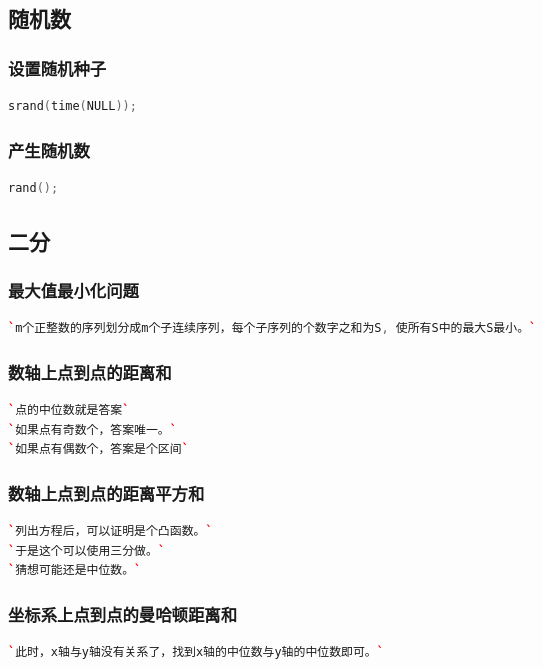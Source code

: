 \documentclass[a4paper]{article}
\begin{document}
\begin{CJK*}{UTF8}{gbsn}
\begin{multicols}{3}
\begin{flushleft}
\subsection{随机数}

\subsubsection{设置随机种子}
\begin{lstlisting}[language={c++}]
srand(time(NULL));
\end{lstlisting}

\subsubsection{产生随机数}
\begin{lstlisting}[language={c++}]
rand();
\end{lstlisting}




\subsection{二分}

\subsubsection{最大值最小化问题}
\begin{lstlisting}[language={c++}]
`m个正整数的序列划分成m个子连续序列，每个子序列的个数字之和为S, 使所有S中的最大S最小。`
\end{lstlisting}


\subsubsection{数轴上点到点的距离和}
\begin{lstlisting}[language={c++}]
`点的中位数就是答案`
`如果点有奇数个，答案唯一。`
`如果点有偶数个，答案是个区间`
\end{lstlisting}

\subsubsection{数轴上点到点的距离平方和}
\begin{lstlisting}[language={c++}]
`列出方程后，可以证明是个凸函数。`
`于是这个可以使用三分做。`
`猜想可能还是中位数。`
\end{lstlisting}

\subsubsection{坐标系上点到点的曼哈顿距离和}
\begin{lstlisting}[language={c++}]
`此时，x轴与y轴没有关系了，找到x轴的中位数与y轴的中位数即可。`
\end{lstlisting}


\end{flushleft}
\end{multicols}
\end{CJK*}
\end{document}
